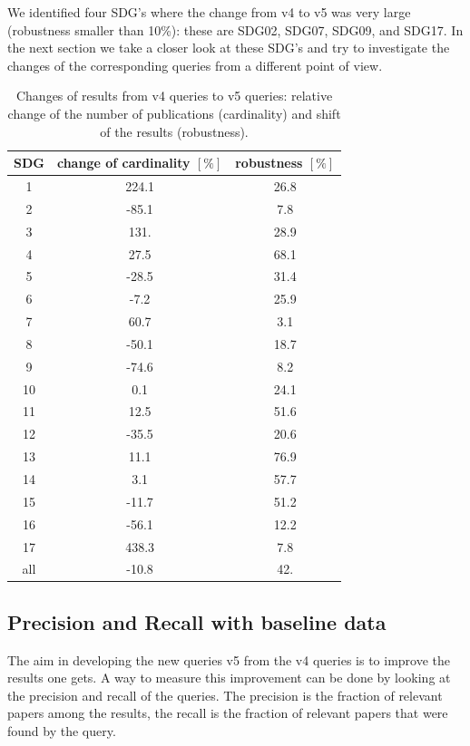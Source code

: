 \documentclass{article}
\begin{document}
We identified four SDG's where the change from v4 to v5 was very large (robustness smaller than 10\%): these are SDG02, SDG07, SDG09, and SDG17. In the next section we take a closer look at these SDG's and try to investigate the changes of the corresponding queries from a different point of view.
\begin{table}[H]
\centering 
 \begin{tabular}{ccc}
 \toprule
  SDG & change of cardinality $[\%]$  & robustness $[\%]$ \\
 \hline
 1 & 224.1 & 26.8 \\
 2 & -85.1 & 7.8 \\
 3 & 131. & 28.9 \\
 4 & 27.5 & 68.1 \\
 5 & -28.5 & 31.4 \\
 6 & -7.2 & 25.9 \\
 7 & 60.7 & 3.1 \\
 8 & -50.1 & 18.7 \\
 9 & -74.6 & 8.2 \\
 10 & 0.1 & 24.1 \\
 11 & 12.5 & 51.6 \\
 12 & -35.5 & 20.6 \\
 13 & 11.1 & 76.9 \\
 14 & 3.1 & 57.7 \\
 15 & -11.7 & 51.2 \\
 16 & -56.1 & 12.2 \\
 17 & 438.3 & 7.8 \\
 all & -10.8 & 42. \\
 \bottomrule
\end{tabular}\caption{Changes of results from v4 queries to v5 queries: relative change of the number of publications (cardinality) and shift of the results (robustness).}
\label{robustnesstable}
\end{table}



\subsection{Precision and Recall with baseline data}
\label{sec:precision-recall}
The aim in developing the new queries v5 from the v4 queries is to improve the results one gets. A way to measure this improvement can be done by looking at the precision and recall of the queries. The precision is the fraction of relevant papers among the results, the recall is the fraction of relevant papers that were found by the query.
\end{document}
